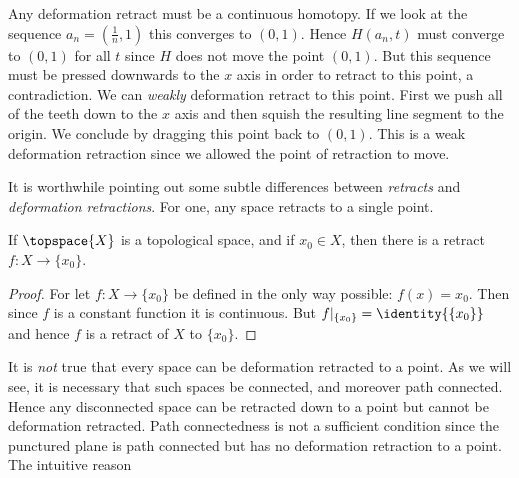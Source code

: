 \documentclass{book}                                                           %
\begin{document}
                \par\hfill\par\vspace{1ex}
                Any deformation retract must be a continuous homotopy. If we
                look at the sequence $a_{n}=(\frac{1}{n},1)$ this converges to
                $(0,1)$.  Hence $H(a_{n},t)$ must converge to $(0,1)$ for all
                $t$ since $H$ does not move the point $(0,1)$. But this sequence
                must be pressed downwards to the $x$ axis in order to retract to
                this point, a contradiction. We can \textit{weakly} deformation
                retract to this point. First we push all of the teeth down to
                the $x$ axis and then squish the resulting line segment to the
                origin. We conclude by dragging this point back to $(0,1)$. This
                is a weak deformation retraction since we allowed the point of
                retraction to move.
                \par\hfill\par
                It is worthwhile pointing out some subtle differences between
                \textit{retracts} and \textit{deformation retractions}. For one,
                any space retracts to a single point.
                \begin{theorem}
                    If $\topspace{X}$ is a topological space, and if
                    $x_{0}\in{X}$, then there is a retract
                    $f:X\rightarrow\{x_{0}\}$.
                \end{theorem}
                \begin{proof}
                    For let $f:X\rightarrow\{x_{0}\}$ be defined in the only way
                    possible: $f(x)=x_{0}$. Then since $f$ is a constant
                    function it is continuous. But
                    $f|_{\{x_{0}\}}=\identity{\{x_{0}\}}$ and hence $f$ is a
                    retract of $X$ to $\{x_{0}\}$.
                \end{proof}
                It is \textit{not} true that every space can be deformation
                retracted to a point. As we will see, it is necessary that
                such spaces be connected, and moreover path connected. Hence any
                disconnected space can be retracted down to a point but cannot
                be deformation retracted. Path connectedness is not a sufficient
                condition since the punctured plane is path connected but has
                no deformation retraction to a point. The intuitive reason
\end{document}
